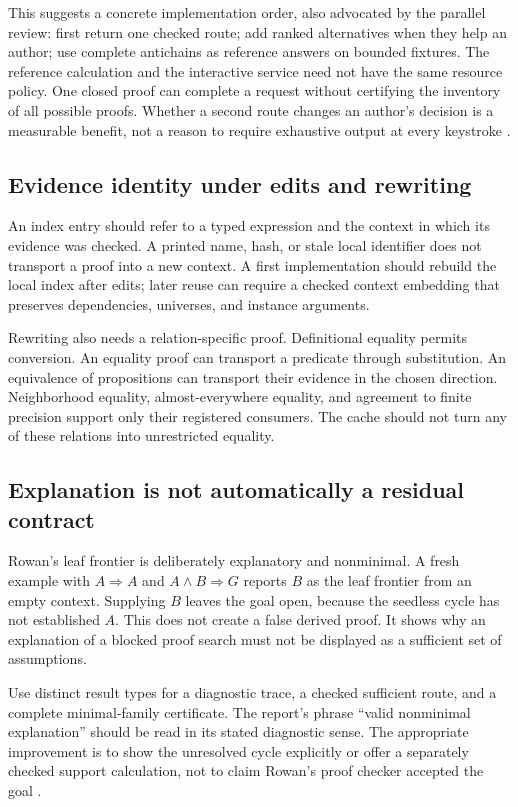\documentclass[11pt,letterpaper]{article}
\theoremstyle{definition}\newtheorem{definition}[proposition]{Definition}
\theoremstyle{remark}\newtheorem{remark}[proposition]{Remark}
\begin{document}
This suggests a concrete implementation order, also advocated by the parallel
review: first return one checked route; add ranked alternatives when they help
an author; use complete antichains as reference answers on bounded fixtures.
The reference calculation and the interactive service need not have the same
resource policy. One closed proof can complete a request without certifying the
inventory of all possible proofs. Whether a second route changes an author's
decision is a measurable benefit, not a reason to require exhaustive output
at every keystroke \cite{parallel-r4}.

\subsection{Evidence identity under edits and rewriting}

An index entry should refer to a typed expression and the context in which
its evidence was checked. A printed name, hash, or stale local identifier
does not transport a proof into a new context. A first implementation should
rebuild the local index after edits; later reuse can require a checked context
embedding that preserves dependencies, universes, and instance arguments.

Rewriting also needs a relation-specific proof. Definitional equality permits
conversion. An equality proof can transport a predicate through substitution.
An equivalence of propositions can transport their evidence in the chosen
direction. Neighborhood equality, almost-everywhere equality, and agreement
to finite precision support only their registered consumers. The cache
should not turn any of these relations into unrestricted equality.

\subsection{Explanation is not automatically a residual contract}

Rowan's leaf frontier is deliberately explanatory and nonminimal. A fresh
example with $A\Rightarrow A$ and $A\land B\Rightarrow G$ reports $B$ as
the leaf frontier from an empty context. Supplying $B$ leaves the goal open,
because the seedless cycle has not established $A$. This does not create a
false derived proof. It shows why an explanation of a blocked proof search
must not be displayed as a sufficient set of assumptions.

Use distinct result types for a diagnostic trace, a checked sufficient route,
and a complete minimal-family certificate. The report's phrase ``valid
nonminimal explanation'' should be read in its stated diagnostic sense.
The appropriate improvement is to show the unresolved cycle explicitly or
offer a separately checked support calculation, not to claim Rowan's proof
checker accepted the goal \cite{rowan}.
\end{document}
